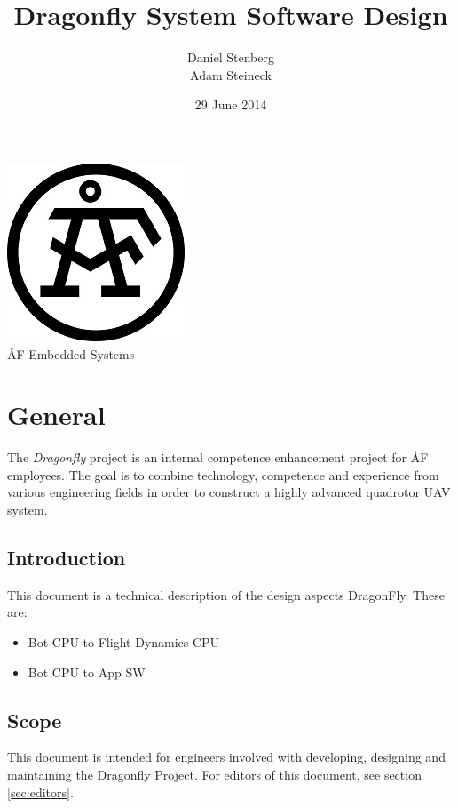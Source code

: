 \documentclass[a4paper]{article}
\title{Dragonfly System Software Design}
\author{Daniel Stenberg \\ Adam Steineck}
\date{29 June 2014}         		%
\begin{document}

\maketitle                      		%

\begin{center}
\vspace{64pt}
\includegraphics[scale=1.6]{images/AF_Logotype20141_Black.png}
\vspace{16pt}
\\ \large ÅF Embedded Systems
\end{center}

\newpage

\tableofcontents				%

\newpage

\section{General}

The \emph{Dragonfly} project is an internal competence enhancement project for ÅF employees. The goal is to combine technology, competence and experience from various engineering fields in order to construct a highly advanced quadrotor UAV system.

\subsection{Introduction}
This document is a technical description of the design aspects DragonFly. These are:
\begin{itemize}
\item Bot CPU to Flight Dynamics CPU
\item Bot CPU to App SW
\end{itemize}

\subsection{Scope}
This document is intended for engineers involved with developing, designing and maintaining the Dragonfly Project. For editors of this document, see section \ref{sec:editors}.
\end{document}
